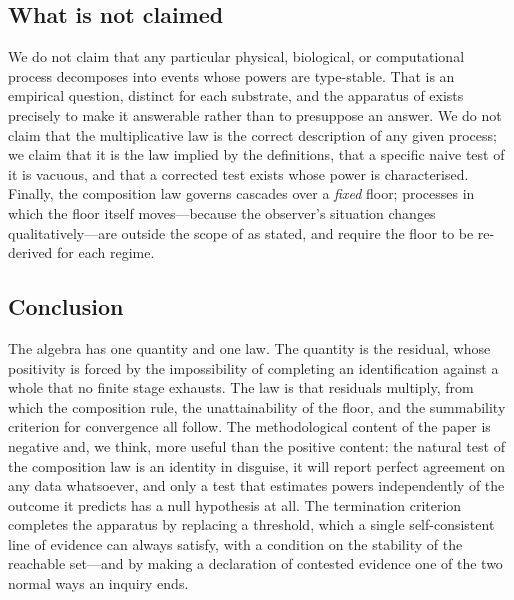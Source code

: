 \documentclass[11pt,a4paper]{article}
\theoremstyle{thmstyle}
\theoremstyle{definition}
\theoremstyle{remark}
\begin{document}
\subsection{What is not claimed}

We do not claim that any particular physical, biological, or computational
process decomposes into events whose powers are type-stable. That is an
empirical question, distinct for each substrate, and the apparatus of
 exists precisely to make it answerable rather than to
presuppose an answer. We do not claim that the multiplicative law is the
correct description of any given process; we claim that it is the law
implied by the definitions, that a specific naive test of it is vacuous, and
that a corrected test exists whose power is characterised. Finally, the
composition law governs cascades over a \emph{fixed} floor; processes in
which the floor itself moves---because the observer's situation changes
qualitatively---are outside the scope of  as stated,
and require the floor to be re-derived for each regime.

\subsection{Conclusion}

The algebra has one quantity and one law. The quantity is the residual, whose
positivity is forced by the impossibility of completing an identification
against a whole that no finite stage exhausts. The law is that residuals
multiply, from which the composition rule, the unattainability of the floor,
and the summability criterion for convergence all follow. The methodological
content of the paper is negative and, we think, more useful than the
positive content: the natural test of the composition law is an identity in
disguise, it will report perfect agreement on any data whatsoever, and only
a test that estimates powers independently of the outcome it predicts has a
null hypothesis at all. The termination criterion completes the apparatus by
replacing a threshold, which a single self-consistent line of evidence can
always satisfy, with a condition on the stability of the reachable set---and
by making a declaration of contested evidence one of the two normal ways an
inquiry ends.



\end{document}
